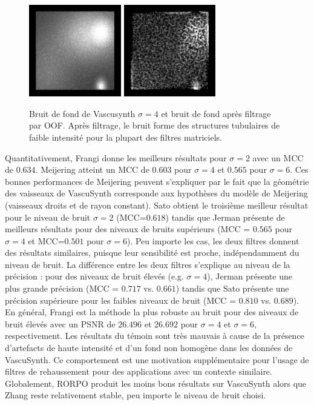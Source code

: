 \begin{figure}[!ht]
  \centering
  \includegraphics[height=4cm]{Images/vascu_noise.png}
  \includegraphics[height=4cm]{Images/vascu_noise_OOF.png}
  \caption{Bruit de fond de Vascusynth $\sigma=4$ et bruit de fond après filtrage par OOF. Après filtrage, le bruit forme des structures tubulaires de faible intensité pour la plupart des filtres matriciels.}
  \label{fig:noisy_tubes}
\end{figure}

Quantitativement, Frangi donne les meilleurs résultats pour $\sigma=2$ avec un MCC de $0.634$. Meijering  atteint un MCC de $0.603$ pour $\sigma=4$ et $0.565$ pour $\sigma=6$. Ces bonnes performances de Meijering peuvent s'expliquer par le fait que la géométrie des vaisseaux de VascuSynth corresponde aux hypothèses du modèle de Meijering (vaisseaux droits et de rayon constant). Sato obtient le troisième meilleur résultat pour le niveau de bruit $\sigma=2$ (MCC=$0.618$) tandis que Jerman présente de meilleurs résultats pour des niveaux de bruits supérieurs (MCC = $0.565$ pour $\sigma=4$ et MCC=$0.501$ pour $\sigma = 6$). Peu importe les cas, les deux filtres donnent des résultats similaires, puisque leur sensibilité est proche, indépendamment du niveau de bruit. La différence entre les deux filtres s'explique au niveau de la précision : pour des niveaux de bruit élevés (e.g. $\sigma=4$), Jerman présente une plus grande précision (MCC = $0.717$ vs. $0.661$) tandis que Sato présente une précision supérieure pour les faibles niveaux de bruit (MCC = $0.810$ vs. $0.689$). En général, Frangi est la méthode la plus robuste au bruit pour des niveaux de bruit élevés avec un PSNR de $26.496$ et $26.692$ pour $\sigma=4$ et $\sigma=6$, respectivement. Les résultats du témoin sont très mauvais à cause de la présence d'artefacts de haute intensité et d'un fond non homogène dans les données de VascuSynth. Ce comportement est une motivation supplémentaire pour l'usage de filtres de rehaussement pour des applications avec un contexte similaire. Globalement, RORPO produit les moins bons résultats sur VascuSynth alors que Zhang reste relativement stable, peu importe le niveau de bruit choisi.

